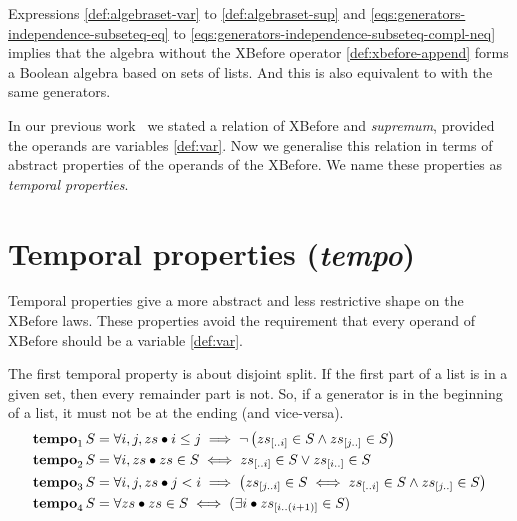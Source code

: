 \documentclass[12pt,openright,twoside,a4paper,oldfontcommands,english,brazil,final]{abntex2}
\newcommand{\todo}[1]{\adnote{#1}}
\theoremstyle{theo}
\newcommand{\sliceright}[2]{\ensuremath #1_{\left[..#2\right]}}
\newcommand{\sliceleft}[2]{\ensuremath #1_{\left[#2..\right]}}
\newcommand{\slice}[3]{\ensuremath #1_{\left[#2..#3\right]}}
\def\tempotext{tempo\xspace}
\def\tempoop{\ensuremath\operatorname{\mathbf{tempo}}}
\newcommand{\tempo}[2][1-4]{\ensuremath\tempoop_{#1} #2}
\begin{document}
Expressions \eqref{def:algebraset-var} to \eqref{def:algebraset-sup} and \eqref{eqs:generators-independence-subseteq-eq} to \eqref{eqs:generators-independence-subseteq-compl-neq} implies that the \ac{algebra} without the \ac{XBefore} operator \eqref{def:xbefore-append} forms a Boolean algebra based on sets of lists.
And this is also equivalent to  with the same generators.

In our previous work~\cite{DM2015} we stated a relation of \ac{XBefore} and \emph{supremum}, provided the operands are variables \eqref{def:var}.
Now we generalise this relation in terms of abstract properties of the operands of the \ac{XBefore}.
We name these properties as \emph{temporal properties}.

\section{Temporal properties (\emph{\tempotext})}
\label{sec:temporal-properties}

Temporal properties give a more abstract and less restrictive shape on the \ac{XBefore} laws.
These properties avoid the requirement that every operand of \ac{XBefore} should be a variable \eqref{def:var}.

The first temporal property is about disjoint split.
If the first part of a list is in a given set, then every remainder part is not.
So, if a generator is in the beginning of a list, it must not be at the ending (and vice-versa).
%
%
\begin{subequations}
\begin{align}
\tempo[1]{S} &= \forall i, j, zs \bullet
  i \le j \implies
  \lnot \left(
    \sliceright{zs}{i} \in S \land \sliceleft{zs}{j} \in S
  \right)\label{def:tempo1}\\
\tempo[2]{S} &= \forall i, zs \bullet
  zs \in S \iff
  \sliceright{zs}{i} \in S \lor \sliceleft{zs}{i} \in S\label{def:tempo2}\\
\tempo[3]{S} &= \forall i, j, zs \bullet
  j < i \implies
  \left(
    \slice{zs}{j}{i} \in S \iff \sliceright{zs}{i} \in S \land \sliceleft{zs}{j} \in S
  \right)\label{def:tempo3}\\
\tempo[4]{S} &= \forall zs \bullet zs \in S \iff (\exists i \bullet \slice{zs}{i}{\left(i+1\right)} \in S)\label{def:tempo4}
\end{align}
\end{subequations}
\end{document}
